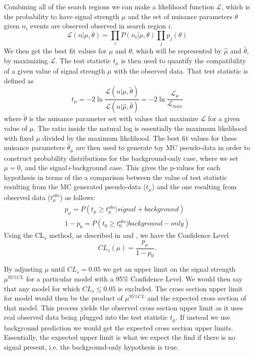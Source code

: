 Combining all of the search regions we can make a likelihood function $\mathcal{L}$, which is the probability to have signal strength $\mu$ and the set of nuisance parameters $\theta$ given $n_i$ events are observed observed in search region $i$.
\begin{equation}
	\mathcal{L}(n|\mu,\theta) = \prod_{i}P(n_i|\mu, \theta)\prod_{j}p_j(\theta)
\end{equation} 
We then get the best fit values for $\mu$ and $\theta$, which will be represented by $\hat{\mu}$ and $\hat{\theta}$, by maximizing $\mathcal{L}$.  The test statistic $t_\mu$ is then used to quantify the compatibility of a given value of signal strength $\mu$ with the observed data.  That test statistic is defined as
\begin{equation}
	t_\mu = -2\ln \frac{\mathcal{L}(n|\mu, \tilde{\theta})}{\mathcal{L}(n|\hat{\mu}, \hat{\theta})} = -2\ln \frac{\mathcal{L}_\mu}{\mathcal{L}_{max}}
\end{equation}
where $\tilde{\theta}$ is the nuisance parameter set with values that maximize $\mathcal{L}$ for a given value of $\mu$.  The ratio inside the natural log is essentially the maximum likelihood with fixed $\mu$ divided by the maximum likelihood.  The best fit values for these nuisance parameters $\hat{\theta}_\mu$ are then used to generate toy MC pseudo-data in order to construct probability distributions for the background-only case, where we set $\mu=0$, and the signal+background case.  This gives the p-values for each hypothesis in terms of the a comparison between the value of test statistic resulting from the MC generated pseudo-data ($t_\mu$) and the one resulting from observed data ($t_\mu^{obs}$) as follows:
\begin{eqnarray}
	p_\mu = P(t_\mu \geq t_\mu^{obs}|signal + background) \\
	1-p_0 = P(t_0 \geq t_0^{obs}|background-only)
\end{eqnarray} 
Using the CL$_s$ method, as described in \cite{Junk:1999kv} and \cite{Read:2002hq}, we have the Confidence Level 
\begin{equation}
	CL_s(\mu) = \frac{p_\mu}{1-p_0}.
\end{equation}

By adjusting $\mu$ until $CL_s = 0.05$ we get an upper limit on the signal strength $\mu^{95\%CL}$ for a particular model with a 95\% Confidence Level.  We would then say that any model for which $CL_s \leq 0.05$ is excluded.  The cross section upper limit for model would then be the product of $\mu^{95\%CL}$ and the expected cross section of that model.  This process yields the observed cross section upper limit as it uses real observed data being plugged into the test statistic $t_\mu$.  If instead we use background prediction we would get the expected cross section upper limits.  Essentially, the expected upper limit is what we expect the find if there is no signal present, i.e. the background-only hypothesis is true.

